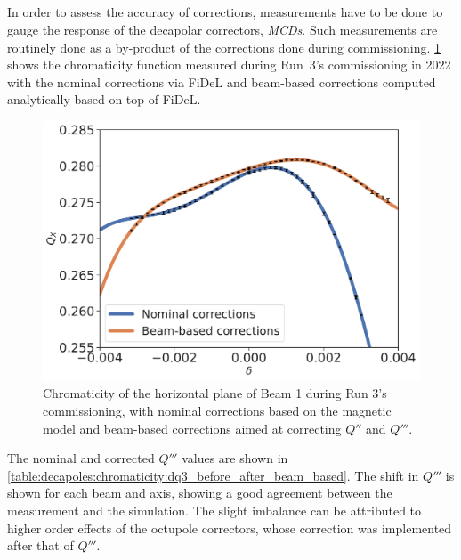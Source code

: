 \subsection{}


In order to assess the accuracy of corrections, measurements have to be done to gauge the response
of the decapolar correctors, \textit{MCDs}.
Such measurements are routinely done as a by-product of the corrections done during commissioning.
\cref{figure:decapoles:chromaticity:dq3_comparison} shows the chromaticity function measured during
Run~3's commissioning in 2022 with the nominal corrections via FiDeL and beam-based corrections
computed analytically based on top of FiDeL.

\begin{figure}[H]
    \centering
    \includegraphics[width=0.8\columnwidth]{images/nominal_vs_beam_based_corrections.pdf}
    \caption{Chromaticity of the horizontal plane of Beam 1 during Run 3's commissioning, with
    nominal corrections based on the magnetic model and beam-based corrections aimed at correcting
     $Q''$ and $Q'''$.}
    \label{figure:decapoles:chromaticity:dq3_comparison}
\end{figure}

The nominal and corrected $Q'''$ values are shown in
\cref{table:decapoles:chromaticity:dq3_before_after_beam_based}. The shift in $Q'''$ is shown for
each beam and axis, showing a good agreement between the measurement and the simulation.
The slight imbalance can be attributed to higher order effects of the octupole correctors, whose
correction was implemented after that of $Q'''$.

